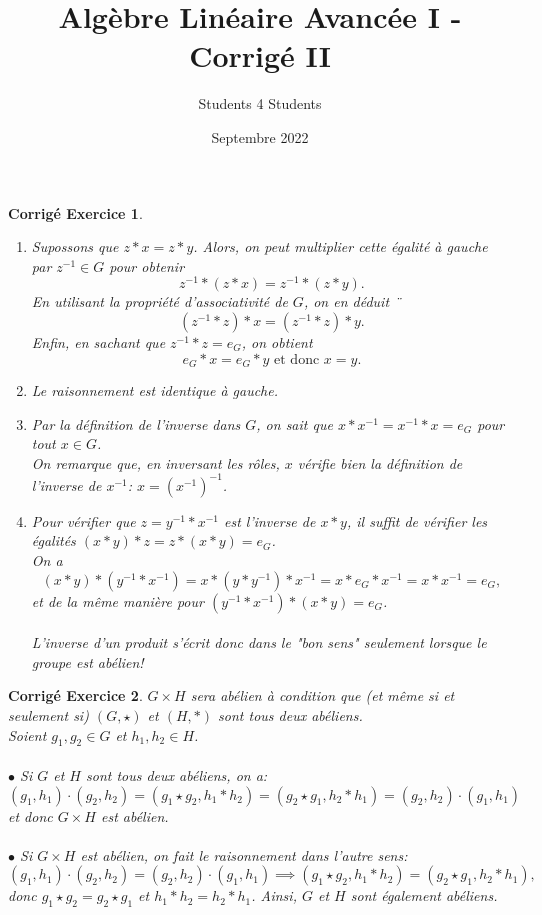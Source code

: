 \documentclass[11pt,french,table]{article}
\title{Algèbre Linéaire Avancée I - Corrigé II}
\author{Students 4 Students}
\date{Septembre 2022}
\theoremstyle{exercice}
\theoremstyle{corrigé}
\newtheorem{corrigé}{Corrigé Exercice}
\begin{document}
\maketitle
\vspace{1em}
\begin{corrigé}
\,
\begin{enumerate}
\item Supossons que $z*x=z*y$. Alors, on peut multiplier cette égalité à gauche par $z^{-1} \in G $ pour obtenir
$$z^{-1} * (z * x) = z^{-1} * (z * y).$$
En utilisant la propriété d'associativité de $G$, on en déduit
¨$$(z^{-1} * z) * x = (z^{-1} * z) * y.$$
Enfin, en sachant que $z^{-1} * z = e_G$, on obtient
$$e_G * x = e_G * y \text{ et donc } x = y.$$
\item  Le raisonnement est identique à gauche.
\item Par la définition de l'inverse dans $G$, on sait que $x*x^{-1}=x^{-1}*x=e_G$ pour tout $x \in G$. \\
On remarque que, en inversant les rôles, $x$ vérifie bien la définition de l'inverse de $x^{-1}$: $x = \left( x^{-1} \right) ^{-1}$.
\item Pour vérifier que $z = y^{-1} * x^{-1}$ est l'inverse de $x * y$, il suffit de vérifier les égalités $(x * y) * z = z * (x * y) = e_G$. \\
On a $$(x * y) * (y^{-1} * x^{-1}) = x * (y * y^{-1}) * x^{-1} = x * e_G * x^{-1} = x * x^{-1} = e_G,$$
et de la même manière pour $(y^{-1} * x^{-1}) * (x * y) = e_G$. \\ \\
L'inverse d'un produit s'écrit donc dans le "bon sens" seulement lorsque le groupe est abélien! \\
\end{enumerate}
\end{corrigé}
\vspace{2em}
\begin{corrigé}
$G \times H$ sera abélien à condition que (et même si et seulement si) $(G,\star)$ et $(H,*)$ sont tous deux abéliens. \\
Soient $g_1,g_2 \in G$ et $h_1,h_2 \in H$. \\
\\
$\bullet$ Si $G$ et  $H$ sont tous deux abéliens, on a:
$$(g_1,h_1) \cdot (g_2,h_2) = (g_1 \star g_2, h_1 * h_2) = (g_2 \star g_1, h_2 * h_1) = (g_2,h_2) \cdot (g_1,h_1)$$
et donc $G \times H$ est abélien. \\
\\
$\bullet$ Si $G \times H$ est abélien, on fait le raisonnement dans l'autre sens:
$$(g_1,h_1) \cdot (g_2,h_2) = (g_2,h_2) \cdot (g_1,h_1) \implies (g_1 \star g_2,h_1 * h_2) = (g_2 \star g_1, h_2 * h_1),$$
donc $g_1 \star g_2 = g_2 \star g_1$ et $h_1 * h_2 = h_2 * h_1$. Ainsi, $G$ et $H$ sont également abéliens.
\end{corrigé}
\end{document}

